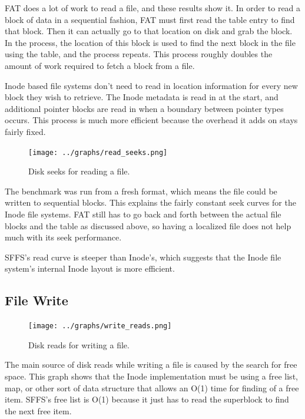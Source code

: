 \documentclass[10pt,twocolumn]{article}
\begin{document}
  FAT does a lot of work to read a file, and these results show it. In order to
  read a block of data in a sequential fashion, FAT must first read the table
  entry to find that block. Then it can actually go to that location on disk
  and grab the block. In the process, the location of this block is used to
  find the next block in the file using the table, and the process repeats.
  This process roughly doubles the amount of work required to fetch a block
  from a file.

  Inode based file systems don't need to read in location information for
  every new block they wish to retrieve. The Inode metadata is read in at the
  start, and additional pointer blocks are read in when a boundary between
  pointer types occurs. This process is much more efficient because the
  overhead it adds on stays fairly fixed.

  \begin{figure}[h]
    \begin{center}
      \texttt{[image: ../graphs/read\_seeks.png]}
      \label{fig:delete_seeks}
      \caption{Disk seeks for reading a file.}
    \end{center}
  \end{figure}

  The benchmark was run from a fresh format, which means the file could be
  written to sequential blocks. This explains the fairly constant seek curves
  for the Inode file systems. FAT still has to go back and forth between the
  actual file blocks and the table as discussed above, so having a localized
  file does not help much with its seek performance.

  SFFS's read curve is steeper than Inode's, which suggests that 
  the Inode file system's internal Inode layout is more efficient.

  \subsection{File Write}
  \begin{figure}[h]
    \begin{center}
      \texttt{[image: ../graphs/write\_reads.png]}
      \label{fig:delete_seeks}
      \caption{Disk reads for writing a file.}
    \end{center}
  \end{figure}

  The main source of disk reads while writing a file is caused by the search
  for free space. This graph shows that the Inode implementation must be using
  a free list, map, or other sort of data structure that allows an O(1) time
  for finding of a free item. SFFS's free list is O(1) because it just has to
  read the superblock to find the next free item.
\end{document}
